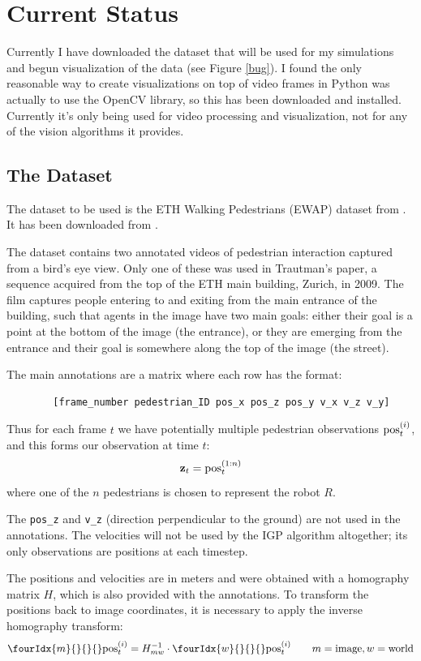 \documentclass[a4paper,11pt,headings=small]{article}
\begin{document}
\section*{Current Status}
\quad Currently I have downloaded the dataset that will be used for my simulations and begun visualization of the data (see Figure \ref{bug}). I found the only reasonable way to create visualizations on top of video frames in Python was actually to use the OpenCV library\cite{opencv}, so this has been downloaded and installed. Currently it's only being used for video processing and visualization, not for any of the vision algorithms it provides.

\subsection*{The Dataset}
\quad The dataset to be used is the ETH Walking Pedestrians (EWAP) dataset from \cite{Pellegrini2009}. It has been downloaded from \cite{dataset}.

The dataset contains two annotated videos of pedestrian interaction captured from a bird's eye view. Only one of these was used in Trautman's paper, a sequence acquired from the top of the ETH main building, Zurich, in 2009. The film captures people entering to and exiting from the main entrance of the building, such that agents in the image have two main goals: either their goal is a point at the bottom of the image (the entrance), or they are emerging from the entrance and their goal is somewhere along the top of the image (the street).

The main annotations are a matrix where each row has the format:
\begin{verbatim}
        [frame_number pedestrian_ID pos_x pos_z pos_y v_x v_z v_y]
\end{verbatim}

Thus for each frame $t$ we have potentially multiple pedestrian observations $\mathrm{pos}^{(i)}_t$, and this forms our observation at time $t$:
$$ \mathbf{z}_t = \mathrm{pos}^{(1:n)}_t $$
where one of the $n$ pedestrians is chosen to represent the robot $R$.

The \texttt{pos\_z} and \texttt{v\_z} (direction perpendicular to the ground) are not used in the annotations. The velocities will not be used by the IGP algorithm altogether; its only observations are positions at each timestep.

The positions and velocities are in meters and were obtained with a homography matrix $H$, which is also provided with the annotations. To transform the positions back to image coordinates, it is necessary to apply the inverse homography transform:
$$ \fourIdx{m}{}{}{}\post = H_{mw}^{-1} \cdot \fourIdx{w}{}{}{}\post \qquad m = \mathrm{image}, w = \mathrm{world} $$
\end{document}
